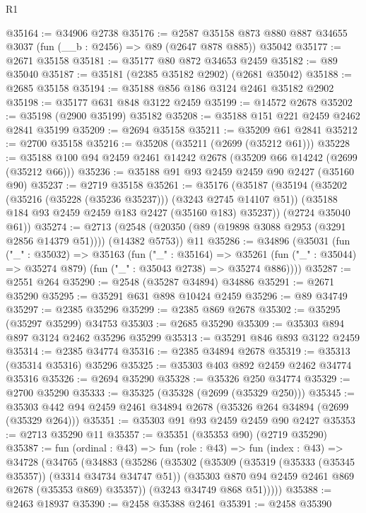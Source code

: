 \begin{lexlean}{R1}
\begin{coremodule}
@35164 := @34906 @2738
@35176 := @2587
    @35158
    @873
    @880
    @887
    @34655
    @3037
    (fun (__b : @2456) => @89 (@2647 @878 @885))
    @35042
@35177 := @2671 @35158
@35181 := @35177 @80 @872 @34653 @2459
@35182 := @89 @35040
@35187 := @35181 (@2385 @35182 @2902) (@2681 @35042)
@35188 := @2685 @35158
@35194 := @35188 @856 @186 @3124 @2461 @35182 @2902
@35198 := @35177 @631 @848 @3122 @2459
@35199 := @14572 @2678
@35202 := @35198 (@2900 @35199) @35182
@35208 := @35188 @151 @221 @2459 @2462 @2841 @35199
@35209 := @2694 @35158
@35211 := @35209 @61 @2841
@35212 := @2700 @35158
@35216 := @35208 (@35211 (@2699 (@35212 @61)))
@35228 := @35188 @100 @94 @2459 @2461 @14242 @2678 (@35209 @66 @14242 (@2699 (@35212 @66)))
@35236 := @35188 @91 @93 @2459 @2459 @90 @2427 (@35160 @90)
@35237 := @2719 @35158
@35261 := @35176
    (@35187
      (@35194
        (@35202 (@35216 (@35228 (@35236 @35237))) (@3243 @2745 @14107 @51))
        (@35188 @184 @93 @2459 @2459 @183 @2427 (@35160 @183) @35237))
      (@2724 @35040 @61))
@35274 := @2713
    (@2548 (@20350 (@89 (@19898 @3088 @2953 (@3291 @2856 @14379 @51)))) (@14382 @5753))
    @11
@35286 := @34896
    (@35031
      (fun ("_" : @35032) =>
      @35163
        (fun ("_" : @35164) =>
        @35261 (fun ("_" : @35044) => @35274 @879) (fun ("_" : @35043 @2738) => @35274 @886))))
@35287 := @2551 @264
@35290 := @2548 (@35287 @34894) @34886
@35291 := @2671 @35290
@35295 := @35291 @631 @898 @10424 @2459
@35296 := @89 @34749
@35297 := @2385 @35296
@35299 := @2385 @869 @2678
@35302 := @35295 (@35297 @35299) @34753
@35303 := @2685 @35290
@35309 := @35303 @894 @897 @3124 @2462 @35296 @35299
@35313 := @35291 @846 @893 @3122 @2459
@35314 := @2385 @34774
@35316 := @2385 @34894 @2678
@35319 := @35313 (@35314 @35316) @35296
@35325 := @35303 @403 @892 @2459 @2462 @34774 @35316
@35326 := @2694 @35290
@35328 := @35326 @250 @34774
@35329 := @2700 @35290
@35333 := @35325 (@35328 (@2699 (@35329 @250)))
@35345 := @35303 @442 @94 @2459 @2461 @34894 @2678 (@35326 @264 @34894 (@2699 (@35329 @264)))
@35351 := @35303 @91 @93 @2459 @2459 @90 @2427
@35353 := @2713 @35290 @11
@35357 := @35351 (@35353 @90) (@2719 @35290)
@35387 := fun (ordinal : @43) =>
  fun (role : @43) =>
  fun (index : @43) =>
  @34728
    (@34765
      (@34883
        (@35286
          (@35302
            (@35309
              (@35319 (@35333 (@35345 @35357)) (@3314 @34734 @34747 @51))
              (@35303 @870 @94 @2459 @2461 @869 @2678 (@35353 @869) @35357))
            (@3243 @34749 @868 @51)))))
@35388 := @2463 @18937
@35390 := @2458 @35388 @2461
@35391 := @2458 @35390

\end{coremodule}
\end{lexlean}
